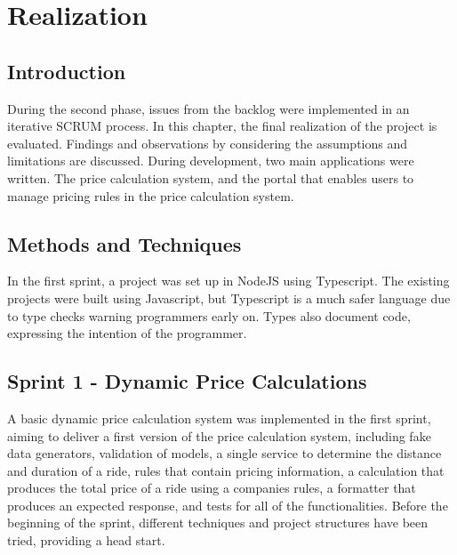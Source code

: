 \graphicspath{{Chapter6/Figs/Vector/}{Chapter6/Figs/}}

%
\chapter{Realization}
\section{Introduction}
During the second phase, issues from the backlog were implemented in an iterative SCRUM process. In this chapter, the final realization of the project is evaluated. Findings and observations by considering the assumptions and limitations are discussed. During development, two main applications were written. The price calculation system, and the portal that enables users to manage pricing rules in the price calculation system.

%
\section{Methods and Techniques}
In the first sprint, a project was set up in NodeJS using Typescript. The existing projects were built using Javascript, but Typescript is a much safer language due to type checks warning programmers early on. Types also document code, expressing the intention of the programmer.

%
\section{Sprint 1 - Dynamic Price Calculations}
A basic dynamic price calculation system was implemented in the first sprint, aiming to deliver a first version of the price calculation system, including fake data generators, validation of models, a single service to determine the distance and duration of a ride, rules that contain pricing information, a calculation that produces the total price of a ride using a companies rules, a formatter that produces an expected response, and tests for all of the functionalities. Before the beginning of the sprint, different techniques and project structures have been tried, providing a head start.

